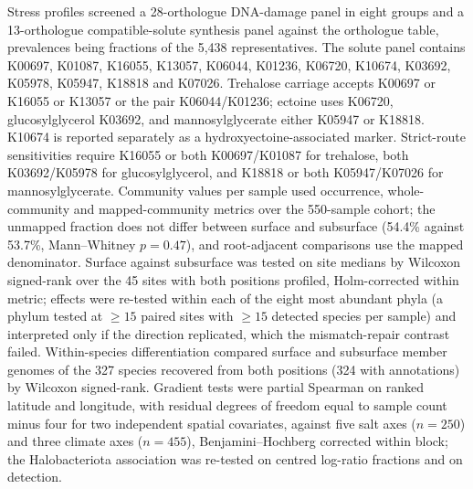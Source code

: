 Stress profiles screened a 28-orthologue DNA-damage panel in eight groups and a 13-orthologue
compatible-solute synthesis panel against the
orthologue table, prevalences being fractions of the 5{,}438 representatives. The solute panel contains K00697, K01087, K16055, K13057, K06044, K01236, K06720, K10674, K03692, K05978, K05947, K18818 and K07026. Trehalose carriage accepts K00697 or K16055 or K13057 or the pair K06044/K01236; ectoine uses K06720, glucosylglycerol K03692, and mannosylglycerate either K05947 or K18818. K10674 is reported separately as a hydroxyectoine-associated marker. Strict-route sensitivities require K16055 or both K00697/K01087 for trehalose, both K03692/K05978 for glucosylglycerol, and K18818 or both K05947/K07026 for mannosylglycerate. Community values per
sample used occurrence, whole-community and mapped-community metrics over the 550-sample cohort;
the unmapped fraction does not differ between surface and subsurface (54.4\% against 53.7\%,
Mann--Whitney $p = 0.47$), and root-adjacent comparisons use the mapped denominator. Surface against
subsurface was tested on site medians by Wilcoxon signed-rank over the 45 sites with both positions
profiled, Holm-corrected within metric; effects were re-tested within each of the eight most
abundant phyla (a phylum tested at $\geq 15$ paired sites with $\geq 15$ detected species per
sample) and interpreted only if the direction replicated, which the mismatch-repair contrast failed.
Within-species differentiation compared surface and subsurface member genomes of the 327 species
recovered from both positions (324 with annotations) by Wilcoxon signed-rank. Gradient tests were
partial Spearman on ranked latitude and longitude, with residual degrees of freedom equal to sample count minus four for two independent spatial covariates, against five salt axes ($n = 250$) and three
climate axes ($n = 455$), Benjamini--Hochberg corrected within block; the Halobacteriota association
was re-tested on centred log-ratio fractions and on detection.

